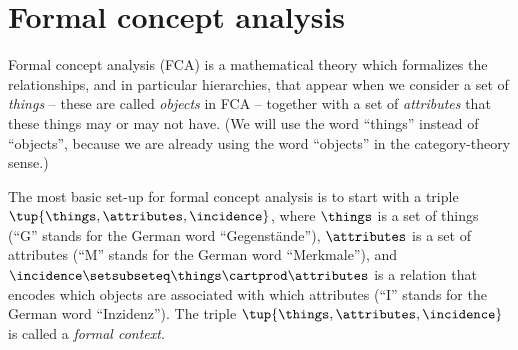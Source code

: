 

\section{Formal concept analysis}

Formal concept analysis (FCA) is a mathematical theory which formalizes the relationships, and in particular hierarchies, that appear when we consider a set of \emph{things} -- these are called \emph{objects} in FCA -- together with a set of \emph{attributes} that these things may or may not have.
(We will use the word ``things'' instead of ``objects'', because we are already using the word ``objects'' in the category-theory sense.)

The most basic set-up for formal concept analysis is to start with a triple $\tup{\things, \attributes, \incidence}$, where $\things$ is a set of things (``G'' stands for the German word ``Gegenst\"ande''), $\attributes$ is a set of attributes (``M'' stands for the German word ``Merkmale''), and $\incidence \setsubseteq \things \cartprod \attributes$ is a relation that encodes which objects are associated with which attributes (``I'' stands for the German word ``Inzidenz'').
The triple $\tup{\things, \attributes, \incidence}$ is called a \emph{formal context}.

